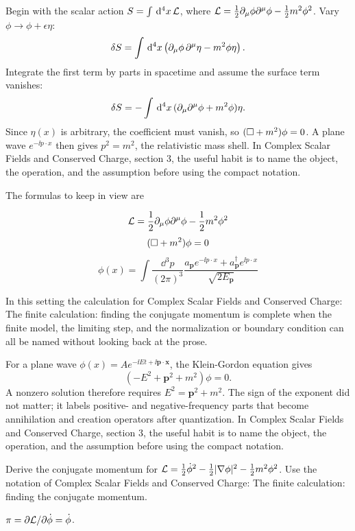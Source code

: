 Begin with the scalar action \(S=\int\,\mathrm d^4x\,\mathcal L\), where \(\mathcal L=\frac12\partial_\mu\phi\partial^\mu\phi-\frac12m^2\phi^2\).  Vary \(\phi\to\phi+\epsilon\eta\):
\[
  \delta S=\int\,\mathrm d^4x\left(\partial_\mu\phi\,\partial^\mu\eta-m^2\phi\eta\right).
\]
Integrate the first term by parts in spacetime and assume the surface term vanishes:
\[
  \delta S=-\int\,\mathrm d^4x\,(\partial_\mu\partial^\mu\phi+m^2\phi)\eta.
\]
Since \(\eta(x)\) is arbitrary, the coefficient must vanish, so \((\Box+m^2)\phi=0\).  A plane wave \(e^{-\ii p\cdot x}\) then gives \(p^2=m^2\), the relativistic mass shell.  In Complex Scalar Fields and Conserved Charge, section 3, the useful habit is to name the object, the operation, and the assumption before using the compact notation.

The formulas to keep in view are

\[
  \mathcal L=\frac12\partial_\mu\phi\partial^\mu\phi-\frac12m^2\phi^2
\]
\[
  (\Box+m^2)\phi=0
\]
\[
  \phi(x)=\int\frac{\dd^3p}{(2\pi)^3}\frac{a_{\bm p}e^{-\ii p\cdot x}+a_{\bm p}^\dagger e^{\ii p\cdot x}}{\sqrt{2E_{\bm p}}}
\]

In this setting the calculation for Complex Scalar Fields and Conserved Charge: The finite calculation: finding the conjugate momentum is complete when the finite model, the limiting step, and the normalization or boundary condition can all be named without looking back at the prose.




\begin{example}
For a plane wave \(\phi(x)=Ae^{-\ii Et+\ii\bm p\cdot\bm x}\), the Klein-Gordon equation gives
\[
  (-E^2+\bm p^2+m^2)\phi=0.
\]
A nonzero solution therefore requires \(E^2=\bm p^2+m^2\).  The sign of the exponent did not matter; it labels positive- and negative-frequency parts that become annihilation and creation operators after quantization.  In Complex Scalar Fields and Conserved Charge, section 3, the useful habit is to name the object, the operation, and the assumption before using the compact notation.
\end{example}



\begin{exercise}
Derive the conjugate momentum for \(\mathcal L=\frac12\dot\phi^2-\frac12|\nabla\phi|^2-\frac12m^2\phi^2\).  Use the notation of Complex Scalar Fields and Conserved Charge: The finite calculation: finding the conjugate momentum.
\begin{answer}
\(\pi=\partial\mathcal L/\partial\dot\phi=\dot\phi\).
\end{answer}
\end{exercise}

